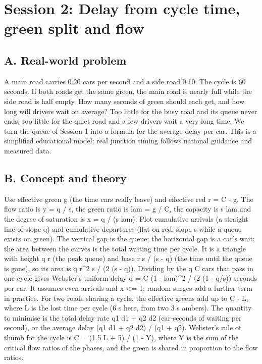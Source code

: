 \documentclass[11pt,a4paper]{article}
\begin{document}
\section{Session 2: Delay from cycle time, green split and flow}

\subsection*{A. Real-world problem}
A main road carries 0.20 cars per second and a side road 0.10. The cycle is 60 seconds. If both roads get the same green, the main road is nearly full while the side road is half empty. How many seconds of green should each get, and how long will drivers wait on average? Too little for the busy road and its queue never ends; too little for the quiet road and a few drivers wait a very long time. We turn the queue of Session 1 into a formula for the average delay per car. This is a simplified educational model; real junction timing follows national guidance and measured data.

\subsection*{B. Concept and theory}
Use effective green g (the time cars really leave) and effective red r = C - g. The flow ratio is y = q / s, the green ratio is lam = g / C, the capacity is s lam and the degree of saturation is x = q / (s lam). Plot cumulative arrivals (a straight line of slope q) and cumulative departures (flat on red, slope s while a queue exists on green). The vertical gap is the queue; the horizontal gap is a car's wait; the area between the curves is the total waiting time per cycle. It is a triangle with height q r (the peak queue) and base r s / (s - q) (the time until the queue is gone), so its area is q r\textasciicircum{}2 s / (2 (s - q)). Dividing by the q C cars that pass in one cycle gives Webster's uniform delay d = C (1 - lam)\textasciicircum{}2 / (2 (1 - q/s)) seconds per car. It assumes even arrivals and x \textless{}= 1; random surges add a further term in practice. For two roads sharing a cycle, the effective greens add up to C - L, where L is the lost time per cycle (6 s here, from two 3 s ambers). The quantity to minimise is the total delay rate q1 d1 + q2 d2 (car-seconds of waiting per second), or the average delay (q1 d1 + q2 d2) / (q1 + q2). Webster's rule of thumb for the cycle is C = (1.5 L + 5) / (1 - Y), where Y is the sum of the critical flow ratios of the phases, and the green is shared in proportion to the flow ratios.
\end{document}
